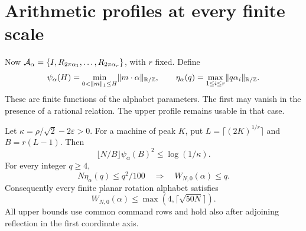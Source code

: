 \section{Arithmetic profiles at every finite scale}\label{sec:arithmetic}
Now $\mathcal A_\alpha=\{I,R_{2\pi\alpha_1},\ldots,R_{2\pi\alpha_r}\}$, with $r$ fixed. Define
\begin{equation}\label{eq:psi-eta}
 \psi_\alpha(H)=\min_{0<\lVert m\rVert_1\le H}\lVert m\cdot\alpha\rVert_{\mathbb R/\mathbb Z},
 \qquad
 \eta_\alpha(q)=\max_{1\le i\le r}\lVert q\alpha_i\rVert_{\mathbb R/\mathbb Z}.
\end{equation}
These are finite functions of the alphabet parameters. The first may vanish in the presence of a rational relation. The upper profile remains usable in that case.

\begin{theorem}\label{thm:arithmetic}
Let $\kappa=\rho/\sqrt2-2\varepsilon>0$. For a machine of peak $K$, put
$L=\lceil(2K)^{1/r}\rceil$ and $B=r(L-1)$. Then
\begin{equation}\label{eq:psi-lower}
 \lfloor N/B\rfloor\psi_\alpha(B)^2\le\log(1/\kappa).
\end{equation}
For every integer $q\ge4$,
\begin{equation}\label{eq:eta-upper}
 N\eta_\alpha(q)\le q^2/100
       \quad\Longrightarrow\quad W_{N,0}(\alpha)\le q.
\end{equation}
Consequently every finite planar rotation alphabet satisfies
\begin{equation}\label{eq:sqrt-upper}
                     W_{N,0}(\alpha)\le\max(4,\lceil\sqrt{50N}\rceil).
\end{equation}
All upper bounds use common command rows and hold also after adjoining reflection in the first coordinate axis.
\end{theorem}
